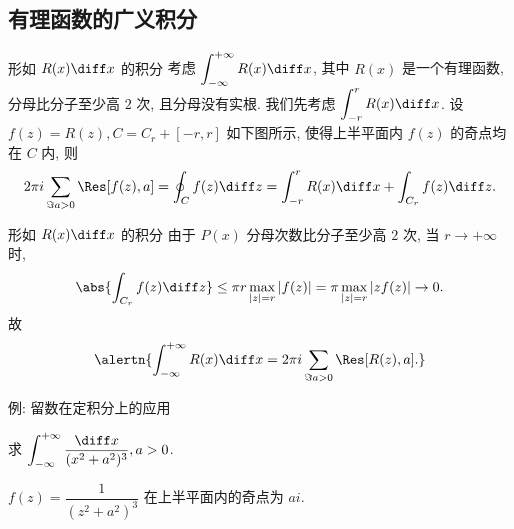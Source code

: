 \subsection{有理函数的广义积分}

\begin{frame}{形如 $R(x)\diff x$ 的积分\noexer}
	\onslide<+->
	考虑 $\displaystyle\int_{-\infty}^{+\infty}R(x)\diff x$, 其中 $R(x)$ 是一个有理函数, 分母比分子至少高 $2$ 次, 且分母没有实根.
	\onslide<+->
	我们先考虑 $\displaystyle\int_{-r}^rR(x)\diff x$.
	\onslide<+->
	设 $f(z)=R(z),C=C_r+[-r,r]$ 如下图所示, 使得上半平面内 $f(z)$ 的奇点均在 $C$ 内,
	\onslide<+->
	则
	\[2\pi i\sum_{\Im a>0}\Res[f(z),a]=\oint_Cf(z)\diff z=\int_{-r}^rR(x)\diff x+\int_{C_r}f(z)\diff z.\]
	\onslide<3->
	\begin{center}
	\end{center}
\end{frame}


\begin{frame}{形如 $R(x)\diff x$ 的积分\noexer}
	\onslide<+->
	由于 $P(x)$ 分母次数比分子至少高 $2$ 次,
	\onslide<+->
	当 $r\to+\infty$ 时,
	\[\abs{\int_{C_r}f(z)\diff z}\le \pi r\max_{|z|=r}|f(z)|
	=\pi \max_{|z|=r}|zf(z)|\to 0.\]
	\onslide<+->
	故
	\[\alertn{\int_{-\infty}^{+\infty}R(x)\diff x=2\pi i\sum_{\Im a>0}\Res[R(z),a].}\]
\end{frame}


\begin{frame}{例: 留数在定积分上的应用\noexer}
	\onslide<+->
	\begin{example}
		求 $\displaystyle\int_{-\infty}^{+\infty}\frac{\diff x}{(x^2+a^2)^3},a>0$.
	\end{example}

	\onslide<+->
	\begin{solution}
		$f(z)=\dfrac1{(z^2+a^2)^3}$ 在上半平面内的奇点为 $ai$.
		\vspace{-\baselineskip}
		\onslide<+->{故
			\[\int_{-\infty}^{+\infty}\frac{\diff x}{(x^2+a^2)^3}
		=2\pi i\Res[f(z),ai]=\frac{3\pi}{8a^5}.\]
		}
		\vspace{-.5\baselineskip}
	\end{solution}
\end{frame}


